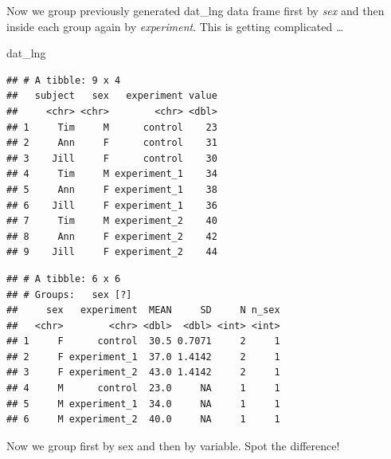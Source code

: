 \documentclass[]{book}
\newenvironment{Shaded}{\begin{snugshade}}{\end{snugshade}}
\newcommand{\KeywordTok}[1]{\textcolor[rgb]{0.13,0.29,0.53}{\textbf{#1}}}
\newcommand{\DataTypeTok}[1]{\textcolor[rgb]{0.13,0.29,0.53}{#1}}
\newcommand{\StringTok}[1]{\textcolor[rgb]{0.31,0.60,0.02}{#1}}
\newcommand{\OperatorTok}[1]{\textcolor[rgb]{0.81,0.36,0.00}{\textbf{#1}}}
\newcommand{\NormalTok}[1]{#1}
\begin{document}
Now we group previously generated dat\_lng data frame first by
\emph{sex} and then inside each group again by \emph{experiment}. This
is getting complicated \ldots{}

\begin{Shaded}
\begin{Highlighting}[]
\NormalTok{dat_lng}
\end{Highlighting}
\end{Shaded}

\begin{verbatim}
## # A tibble: 9 x 4
##   subject   sex   experiment value
##     <chr> <chr>        <chr> <dbl>
## 1     Tim     M      control    23
## 2     Ann     F      control    31
## 3    Jill     F      control    30
## 4     Tim     M experiment_1    34
## 5     Ann     F experiment_1    38
## 6    Jill     F experiment_1    36
## 7     Tim     M experiment_2    40
## 8     Ann     F experiment_2    42
## 9    Jill     F experiment_2    44
\end{verbatim}

\begin{Shaded}
\end{Shaded}

\begin{verbatim}
## # A tibble: 6 x 6
## # Groups:   sex [?]
##     sex   experiment  MEAN     SD     N n_sex
##   <chr>        <chr> <dbl>  <dbl> <int> <int>
## 1     F      control  30.5 0.7071     2     1
## 2     F experiment_1  37.0 1.4142     2     1
## 3     F experiment_2  43.0 1.4142     2     1
## 4     M      control  23.0     NA     1     1
## 5     M experiment_1  34.0     NA     1     1
## 6     M experiment_2  40.0     NA     1     1
\end{verbatim}

Now we group first by sex and then by variable. Spot the difference!

\begin{Shaded}
\end{Shaded}
\end{document}

